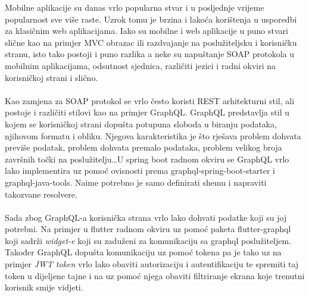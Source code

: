 \documentclass[times, utf8, zavrsni]{fer}
\begin{document}
\begin{sazetak}
      Mobilne aplikacije su danas vrlo popularna stvar i u posljednje vrijeme popularnost sve više raste.
      Uzrok tomu je brzina i lakoća korištenja u usporedbi za klasičnim web aplikacijama. Iako su mobilne
      i web aplikacije u puno stvari slične kao na primjer MVC obrazac ili razdvajanje na poslužiteljsku i
      korisničku stranu, isto tako postoji i puno razlika a neke su napuštanje SOAP protokola u mobilnim
      aplikacijama, odsutnost sjednica, različiti jezici i radni okviri na korisničkoj strani i slično.
      \\\\
      Kao zamjena za SOAP protokol se vrlo često koristi REST arhitekturni stil, ali postoje i različiti
      stilovi kao na primjer GraphQL. GraphQL predstavlja stil u kojem se korisničkoj strani dopušta
      potupuna sloboda u biranju podataka, njihovom formatu i obliku. Njegova karakteristika je što
      rješava problem dohvata previše podatak, problem dohvata premalo podataka, problem velikog broja
      završnih točki na poslužitelju\dots U spring boot radnom okviru se GraphQL vrlo lako implementira uz
      pomoć ovisnosti prema graphql-spring-boot-starter i graphql-java-tools. Naime potrebno je samo definirati
      shemu i napraviti takozvane resolvere.
      \\\\
      Sada zbog GraphQL-a korisnička strana vrlo lako dohvati podatke koji su joj potrebni. Na primjer
      u flutter radnom okviru uz pomoć paketa flutter-graphql koji sadrži \textit{widget-e} koji su
      zaduženi za komunikaciju sa graphql poslužiteljem. Također GraphQL dopušta komunikaciju uz pomoć tokena
      pa je tako uz na primjer \textit{JWT token} vrlo lako obaviti autorizaciju i autentifikaciju te spremiti
      taj token u dijeljene tajne i na uz pomoć njega obaviti filtriranje ekrana koje trenutni korisnik smije
      vidjeti.
      \\\\
      \\\\\\\\
\end{sazetak}
\end{document}
